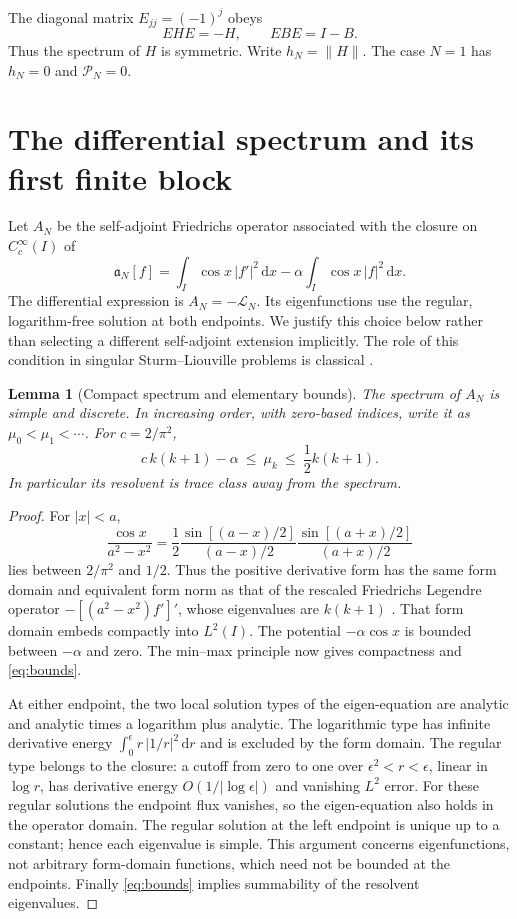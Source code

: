 \documentclass[10pt]{article}
\newtheorem{lemma}[theorem]{Lemma}
\newcommand{\dd}{\mathrm d}
\begin{document}
The diagonal matrix $E_{jj}=(-1)^j$ obeys
\begin{equation}
EHE=-H,\qquad EBE=I-B.
\label{eq:duality}
\end{equation}
Thus the spectrum of $H$ is symmetric. Write $h_N=\|H\|$.
The case $N=1$ has $h_N=0$ and $\mathcal P_N=0$.

\section{The differential spectrum and its first finite block}
Let $A_N$ be the self-adjoint Friedrichs operator associated with the
closure on $C_c^\infty(I)$ of
\begin{equation}
\mathfrak a_N[f]=\int_I \cos x\,|f'|^2\,\dd x
-\alpha\int_I\cos x\,|f|^2\,\dd x.
\label{eq:form}
\end{equation}
The differential expression is $A_N=-\mathcal L_N$.
Its eigenfunctions use the regular, logarithm-free solution at both
endpoints. We justify this choice below rather than selecting a different
self-adjoint extension implicitly. The role of this condition in
singular Sturm--Liouville problems is classical \cite{kaper,littlejohn}.

\begin{lemma}[Compact spectrum and elementary bounds]
The spectrum of $A_N$ is simple and discrete. In increasing order,
with zero-based indices, write it as $\mu_0<\mu_1<\cdots$.
For $c=2/\pi^2$,
\begin{equation}
c\,k(k+1)-\alpha\ \le\ \mu_k\ \le\ \frac12 k(k+1).
\label{eq:bounds}
\end{equation}
In particular its resolvent is trace class away from the spectrum.
\end{lemma}
\begin{proof}
For $|x|<a$,
\[
\frac{\cos x}{a^2-x^2}
=\frac12\frac{\sin[(a-x)/2]}{(a-x)/2}
          \frac{\sin[(a+x)/2]}{(a+x)/2}
\]
lies between $2/\pi^2$ and $1/2$.
Thus the positive derivative form has the same form domain and equivalent
form norm as that of the rescaled Friedrichs Legendre operator
$-[(a^2-x^2)f']'$, whose eigenvalues are $k(k+1)$ \cite{littlejohn}.
That form domain embeds compactly into $L^2(I)$.
The potential $-\alpha\cos x$ is bounded between $-\alpha$ and zero.
The min--max principle now gives compactness and \eqref{eq:bounds}.

At either endpoint, the two local solution types of the eigen-equation
are analytic and analytic times a logarithm plus analytic.
The logarithmic type has infinite derivative energy
$\int_0^\epsilon r\,|1/r|^2\,\dd r$ and is excluded by the form domain.
The regular type belongs to the closure: a cutoff from zero to one
over $\epsilon^2<r<\epsilon$, linear in $\log r$, has derivative energy
$O(1/|\log\epsilon|)$ and vanishing $L^2$ error.
For these regular solutions the endpoint flux vanishes, so the
eigen-equation also holds in the operator domain.
The regular solution at the left endpoint is unique up to a constant;
hence each eigenvalue is simple.
This argument concerns eigenfunctions, not arbitrary form-domain
functions, which need not be bounded at the endpoints.
Finally \eqref{eq:bounds} implies summability of the resolvent eigenvalues.
\end{proof}
\end{document}
